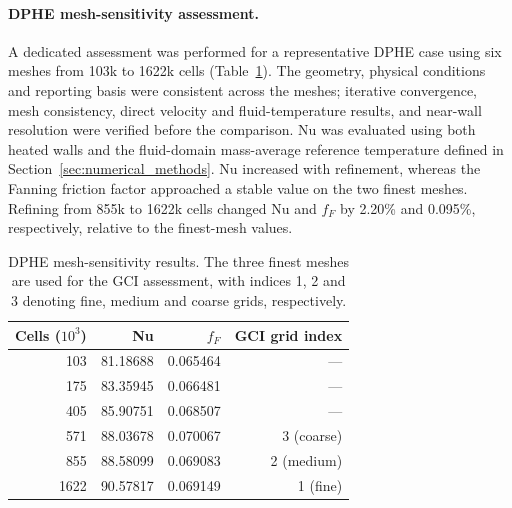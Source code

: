 \paragraph{DPHE mesh-sensitivity assessment.}
A dedicated assessment was performed for a representative DPHE case using six meshes from 103k to 1622k cells (Table~\ref{tab:dphe_mesh_sensitivity}). The geometry, physical conditions and reporting basis were consistent across the meshes; iterative convergence, mesh consistency, direct velocity and fluid-temperature results, and near-wall resolution were verified before the comparison. Nu was evaluated using both heated walls and the fluid-domain mass-average reference temperature defined in Section~\ref{sec:numerical_methods}. Nu increased with refinement, whereas the Fanning friction factor approached a stable value on the two finest meshes. Refining from 855k to 1622k cells changed Nu and $f_F$ by 2.20\% and 0.095\%, respectively, relative to the finest-mesh values.

\begin{table}[!ht]
\caption{DPHE mesh-sensitivity results. The three finest meshes are used for the GCI assessment, with indices 1, 2 and 3 denoting fine, medium and coarse grids, respectively.}
\label{tab:dphe_mesh_sensitivity}
\centering
\begin{tabular}{rrrr}
\toprule
Cells ($10^3$) & Nu & $f_F$ & GCI grid index \\
\midrule
103 & 81.18688 & 0.065464 & --- \\
175 & 83.35945 & 0.066481 & --- \\
405 & 85.90751 & 0.068507 & --- \\
571 & 88.03678 & 0.070067 & 3 (coarse) \\
855 & 88.58099 & 0.069083 & 2 (medium) \\
1622 & 90.57817 & 0.069149 & 1 (fine) \\
\bottomrule
\end{tabular}
\end{table}


